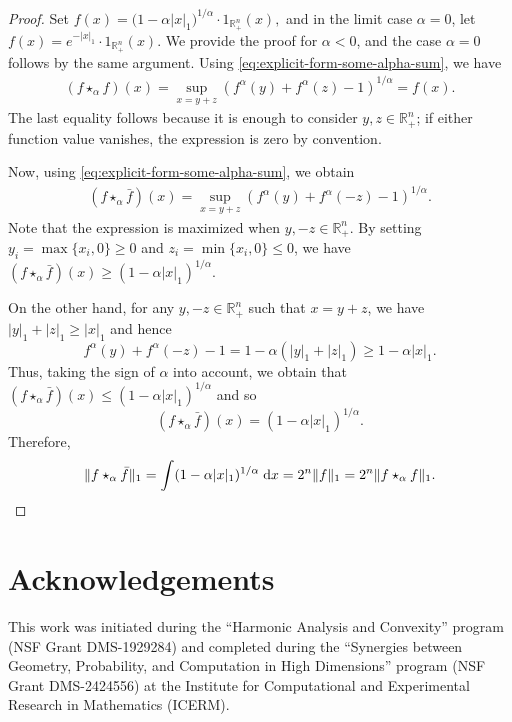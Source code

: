 \documentclass[11pt]{amsart}
\newcommand{\R}{{\mathbb R}}
\theoremstyle{plain}
\theoremstyle{definition}
\theoremstyle{remark}
\begin{document}
\begin{proof}
    Set $f(x)=\bigl(1-\alpha|x|_1\bigr)^{1/\alpha}\cdot {1}_{\mathbb{R}^n_+}(x),$
    and in the limit case $\alpha=0$, let
    \(
    f(x)=e^{-|x|_1} \cdot {1}_{\mathbb{R}^n_+}(x).
    \)
    We provide the proof for $\alpha<0$, and the case $\alpha=0$ follows by the same argument.
    Using \eqref{eq:explicit-form-some-alpha-sum}, we have
    \begin{align*}
        (f \star_\alpha f)  (x)
        = \sup_{x = y+z} (f^\alpha (y) + f^\alpha(z) - 1)^{1/\alpha} = f(x).
    \end{align*}
    The last equality follows because it is enough to consider $y, z \in \mathbb{R}_{+}^n$; if either function value vanishes, the expression is zero by convention.

    Now, using \eqref{eq:explicit-form-some-alpha-sum}, we obtain
    \begin{align*}
        (f \star_\alpha \bar f) (x) = \sup_{x = y+z} (f^\alpha (y) + f^\alpha(-z) - 1)^{1/\alpha}.
    \end{align*}
    Note that the expression is maximized when $ y,-z \in \R^n_+$.
    By setting $ y_i = \max \{x_i,0\}\geq 0$ and $z_i = \min \{x_i,0\}\leq 0$, we have $(f \star_\alpha \bar f) (x) \geq (1-\alpha |x|_1)^{1/\alpha}.$


    On the other hand, for any $y,-z \in \R^n_+$ such that $x = y+z$, we have $|y|_1 + |z|_1 \geq |x|_1$ and hence
     \[
        f^\alpha(y)+f^\alpha(-z)-1=1-\alpha\left(|y|_1+|z|_1\right) \geq 1 - \alpha |x|_1.
     \]
    Thus, taking the sign of \(\alpha\) into account, we obtain that $(f \star_\alpha \bar f) (x) \leq (1-\alpha |x|_1)^{1/\alpha} $ and so
    \[
        (f \star_\alpha \bar f) (x) = (1-\alpha |x|_1)^{1/\alpha}.
    \]
    Therefore,
    \[
        \|f \star_\alpha \bar f \|_1 = \int (1-\alpha |x|_1)^{1/\alpha} \;\mathrm d x  = 2^n \|f\|_1 = 2^n \|  f \star_\alpha f \|_1. \qedhere
    \]
\end{proof}


\section*{Acknowledgements}

This work was initiated during the ``Harmonic Analysis and Convexity'' program (NSF Grant DMS-1929284) and completed during the
``Synergies between Geometry, Probability, and Computation in High Dimensions'' program (NSF Grant DMS-2424556)
at the Institute for Computational and Experimental Research in Mathematics (ICERM).
\end{document}
